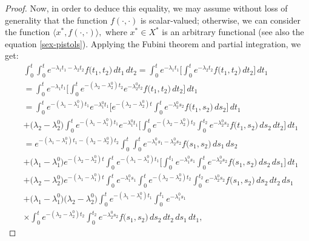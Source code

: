 \documentclass[10pt,a4paper]{amsart}
\begin{document}
\begin{proof}
Now, in order to deduce this equality, we may assume without loss of generality that the function $f(\cdot,\cdot)$ is scalar-valued; otherwise, we can consider the function $\langle x^{\ast}, f(\cdot,\cdot) \rangle ,$ where $x^{\ast}\in X^{\ast}$ is an arbitrary functional (see also the equation \eqref{sex-pistols}).  
Applying the Fubini theorem and partial integration, we get:
\begin{align*}
&\int^{t}_{0}\int^{t}_{0}e^{-\lambda_{1}t_{1}-\lambda_{2}t_{2}}f\bigl( t_{1},t_{2}\bigr)\, dt_{1}\, dt_{2}=\int^{t}_{0}e^{-\lambda_{1}t_{1}}\Biggl[ \int^{t}_{0}e^{-\lambda_{2}t_{2}}f\bigl( t_{1},t_{2}\bigr)\, dt_{2}\Biggr]\, dt_{1}
\\& =\int^{t}_{0}e^{-\lambda_{1}t_{1}}\Biggl[ \int^{t}_{0}e^{-(\lambda_{2}-\lambda_{2}^{0})t_{2}}e^{-\lambda_{2}^{0}t_{2}}f\bigl( t_{1},t_{2}\bigr)\, dt_{2}\Biggr]\, dt_{1}
\\& =\int^{t}_{0}e^{-(\lambda_{1}-\lambda_{1}^{0})t_{1}}e^{-\lambda_{1}^{0}t_{1}}\Biggl[ e^{-(\lambda_{2}-\lambda_{2}^{0})t}\int^{t}_{0}e^{-\lambda_{2}^{0}s_{2}}f\bigl( t_{1},s_{2}\bigr)\, ds_{2}\Biggr]\, dt_{1}
\\& +\bigl( \lambda_{2}-\lambda_{2}^{0}\bigr)\int^{t}_{0}e^{-(\lambda_{1}-\lambda_{1}^{0})t_{1}}e^{-\lambda_{1}^{0}t_{1}}\Biggl[ \int^{t}_{0}e^{-(\lambda_{2}-\lambda_{2}^{0})t_{2}}\int^{t_{2}}_{0}e^{-\lambda_{2}^{0}s_{2}}f\bigl( t_{1},s_{2}\bigr)\, ds_{2}\, dt_{2}\Biggr]\, dt_{1}
\\& =e^{-(\lambda_{1}-\lambda_{1}^{0})t_{1}-(\lambda_{2}-\lambda_{2}^{0})t_{2}}\int^{t}_{0}\int^{t}_{0}e^{-\lambda_{1}^{0}s_{1}-\lambda_{2}^{0}s_{2}}f\bigl( s_{1},s_{2}\bigr)\, ds_{1}\, ds_{2}
\\& +\bigl( \lambda_{1}-\lambda_{1}^{0}\bigr)e^{-(\lambda_{2}-\lambda_{2}^{0})t}\int^{t}_{0}e^{-(\lambda_{1}-\lambda_{1}^{0})t_{1}}\Biggl[\int^{t_{1}}_{0}e^{-\lambda_{1}^{0}s_{1}}\int^{t}_{0}e^{-\lambda_{2}^{0}s_{2}}f\bigl( s_{1},s_{2}\bigr)\, ds_{2}\, ds_{1}\Biggr] \, dt_{1}
\\& +\bigl( \lambda_{2}-\lambda_{2}^{0}\bigr)e^{-(\lambda_{1}-\lambda_{1}^{0})t}\int^{t}_{0}e^{-\lambda_{1}^{0}s_{1}}\int^{t}_{0}e^{-(\lambda_{2}-\lambda_{2}^{0})t_{2}}\int^{t_{2}}_{0}e^{-\lambda_{2}^{0}s_{2}}    f\bigl( s_{1},s_{2}\bigr)\, ds_{2}\, dt_{2} \, ds_{1}
\\& +\bigl( \lambda_{1}-\lambda_{1}^{0}\bigr)\bigl( \lambda_{2}-\lambda_{2}^{0}\bigr)\int^{t}_{0}e^{-(\lambda_{1}-\lambda_{1}^{0})t_{1}}\int^{t_{1}}_{0}e^{-\lambda_{1}^{0}s_{1}}
\\& \times \int^{t}_{0}e^{-(\lambda_{2}-\lambda_{2}^{0})t_{2}}\int^{t_{2}}_{0}e^{-\lambda_{2}^{0}s_{2}}f\bigl( s_{1},s_{2}\bigr)\, ds_{2}\, dt_{2} \, ds_{1}\, dt_{1},

\end{align*}
\end{proof}
\end{document}
